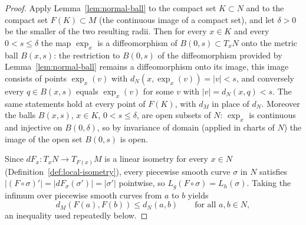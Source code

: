 \begin{proof}
Apply Lemma~\ref{lem:normal-ball} to the compact set $K\subset N$
and to the compact set $F(K)\subset M$ (the continuous image of a
compact set), and let $\delta>0$ be the smaller of the two
resulting radii. Then for every $x\in K$ and every $0<s\le\delta$
the map $\exp_x$ is a diffeomorphism of $B(0,s)\subset T_xN$ onto
the metric ball $B(x,s)$: the restriction to $B(0,s)$ of the
diffeomorphism provided by Lemma~\ref{lem:normal-ball} remains a
diffeomorphism onto its image, this image consists of points
$\exp_x(v)$ with $d_N(x,\exp_x(v))=|v|<s$, and conversely every
$q\in B(x,s)$ equals $\exp_x(v)$ for some $v$ with
$|v|=d_N(x,q)<s$. The same statements hold at every point of
$F(K)$, with $d_M$ in place of $d_N$. Moreover the balls $B(x,s)$,
$x\in K$, $0<s\le\delta$, are open subsets of $N$: $\exp_x$ is
continuous and injective on $B(0,\delta)$, so by invariance of
domain (applied in charts of $N$) the image of the open set
$B(0,s)$ is open.

Since $dF_x\colon T_xN\to T_{F(x)}M$ is a linear isometry for
every $x\in N$ (Definition~\ref{def:local-isometry}), every
piecewise smooth curve $\sigma$ in $N$ satisfies
$|(F\circ\sigma)'|=|dF_\sigma(\sigma')|=|\sigma'|$ pointwise, so
$L_g(F\circ\sigma)=L_h(\sigma)$. Taking the infimum over piecewise
smooth curves from $a$ to $b$ yields
$$d_M\left(F(a),F(b)\right)\le d_N(a,b)
\qquad\text{for all }a,b\in N,$$
an inequality used repeatedly below.


\end{proof}
